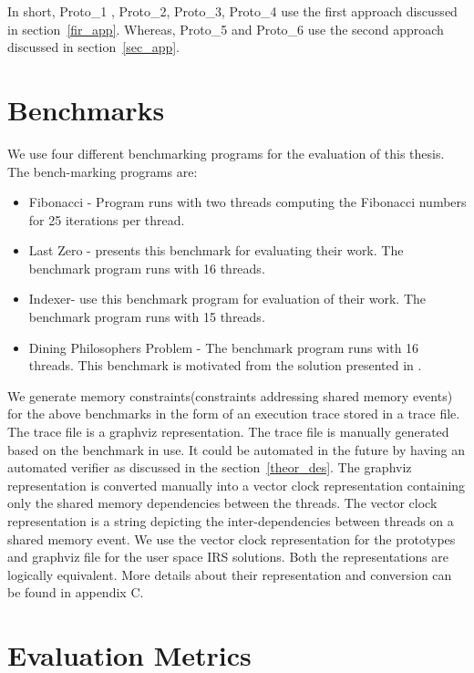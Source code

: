 In short, \Gls{Proto_1} , Proto\_2, Proto\_3, Proto\_4 use the first approach discussed in section~\ref{fir_app}. 
Whereas, Proto\_5 and Proto\_6 use the second approach discussed in section~\ref{sec_app}.

\section{Benchmarks}

We use four different benchmarking programs for the evaluation of this thesis. 
The bench-marking programs are:
\begin{itemize}
\item{Fibonacci} - Program runs with two threads computing the Fibonacci numbers for 25 iterations per thread.
\item{Last Zero} - \citet{abdulla2014optimal} presents this benchmark for evaluating their work. The benchmark program runs with 16 threads.
\item{Indexer}- \citet{dynamic_por} use this benchmark program for evaluation of their work. The benchmark program runs with 15 threads.
\item{Dining Philosophers Problem} - The benchmark program runs with 16 threads. 
This benchmark is motivated from the solution presented in \citet{silberschatz2014operating}.
\end{itemize}

We generate memory constraints(constraints addressing shared memory events) for the above benchmarks in the form of an execution trace stored in a trace file. 
The trace file is a graphviz representation. 
The trace file is manually generated based on the benchmark in use. 
It could be automated in the future by having an automated verifier as discussed in the section~\ref{theor_des}.
The graphviz representation is converted manually into a vector clock representation containing only the shared memory dependencies between the  threads. 
The vector clock representation is a string depicting the inter-dependencies between threads on a shared memory event. 
We use the vector clock representation for the prototypes and graphviz file for the user space IRS solutions. 
Both the representations are logically equivalent. 
More details about their representation and conversion can be found in appendix C. 

\section{Evaluation Metrics}


